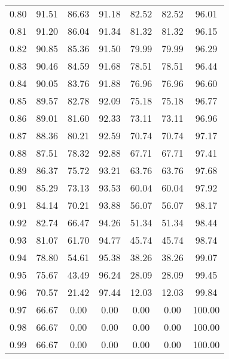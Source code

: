 \begin{tabular}{|c|c|c|c|c|c|c|}
      0.80 &     91.51 &     86.63 &      91.18 &   82.52 &      82.52 &         96.01 \\
      0.81 &     91.20 &     86.04 &      91.34 &   81.32 &      81.32 &         96.15 \\
      0.82 &     90.85 &     85.36 &      91.50 &   79.99 &      79.99 &         96.29 \\
      0.83 &     90.46 &     84.59 &      91.68 &   78.51 &      78.51 &         96.44 \\
      0.84 &     90.05 &     83.76 &      91.88 &   76.96 &      76.96 &         96.60 \\
      0.85 &     89.57 &     82.78 &      92.09 &   75.18 &      75.18 &         96.77 \\
      0.86 &     89.01 &     81.60 &      92.33 &   73.11 &      73.11 &         96.96 \\
      0.87 &     88.36 &     80.21 &      92.59 &   70.74 &      70.74 &         97.17 \\
      0.88 &     87.51 &     78.32 &      92.88 &   67.71 &      67.71 &         97.41 \\
      0.89 &     86.37 &     75.72 &      93.21 &   63.76 &      63.76 &         97.68 \\
      0.90 &     85.29 &     73.13 &      93.53 &   60.04 &      60.04 &         97.92 \\
      0.91 &     84.14 &     70.21 &      93.88 &   56.07 &      56.07 &         98.17 \\
      0.92 &     82.74 &     66.47 &      94.26 &   51.34 &      51.34 &         98.44 \\
      0.93 &     81.07 &     61.70 &      94.77 &   45.74 &      45.74 &         98.74 \\
      0.94 &     78.80 &     54.61 &      95.38 &   38.26 &      38.26 &         99.07 \\
      0.95 &     75.67 &     43.49 &      96.24 &   28.09 &      28.09 &         99.45 \\
      0.96 &     70.57 &     21.42 &      97.44 &   12.03 &      12.03 &         99.84 \\
      0.97 &     66.67 &      0.00 &       0.00 &    0.00 &       0.00 &        100.00 \\
      0.98 &     66.67 &      0.00 &       0.00 &    0.00 &       0.00 &        100.00 \\
      0.99 &     66.67 &      0.00 &       0.00 &    0.00 &       0.00 &        100.00 \\
\bottomrule
\end{tabular}
